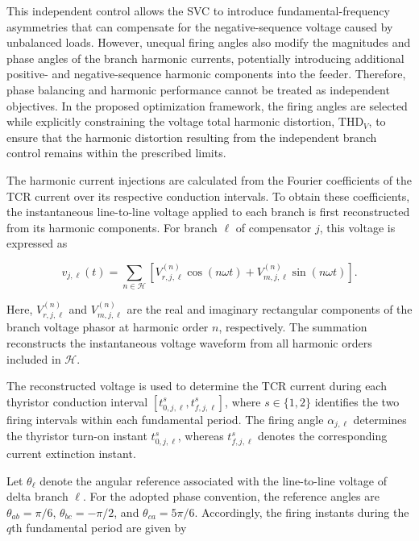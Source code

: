 \documentclass[journal]{IEEEtran}
\begin{document}
This independent control allows the SVC to introduce fundamental-frequency
asymmetries that can compensate for the negative-sequence voltage caused
by unbalanced loads. However, unequal firing angles also modify the
magnitudes and phase angles of the branch harmonic currents, potentially
introducing additional positive- and negative-sequence harmonic
components into the feeder. Therefore, phase balancing and harmonic
performance cannot be treated as independent objectives. In the proposed
optimization framework, the firing angles are selected while explicitly
constraining the voltage total harmonic distortion, $\mathrm{THD}_V$,
to ensure that the harmonic distortion resulting from the independent
branch control remains within the prescribed limits.



The harmonic current injections are calculated from the Fourier
coefficients of the TCR current over its respective conduction intervals.
To obtain these coefficients, the instantaneous line-to-line voltage
applied to each branch is first reconstructed from its harmonic components.
For branch $\ell$ of compensator $j$, this voltage is expressed as

\begin{equation}
    v_{j,\ell}(t)=
    \sum_{n\in\mathcal{H}}
    \left[V_{r,j,\ell}^{(n)}\cos(n\omega t)+
    V_{m,j,\ell}^{(n)}\sin(n\omega t)\right].
    \label{eq:branch_voltage_waveform}
\end{equation}

Here, $V_{r,j,\ell}^{(n)}$ and $V_{m,j,\ell}^{(n)}$ are the real and
imaginary rectangular components of the branch voltage phasor at harmonic
order $n$, respectively. The summation reconstructs the instantaneous
voltage waveform from all harmonic orders included in $\mathcal{H}$.

The reconstructed voltage is used to determine the TCR current during
each thyristor conduction interval
$[t_{0,j,\ell}^{s},t_{f,j,\ell}^{s}]$, where
$s\in\{1,2\}$ identifies the two firing intervals within each fundamental
period. The firing angle $\alpha_{j,\ell}$ determines the thyristor
turn-on instant $t_{0,j,\ell}^{s}$, whereas
$t_{f,j,\ell}^{s}$ denotes the corresponding current extinction instant.

Let $\theta_\ell$ denote the angular reference associated with the
line-to-line voltage of delta branch $\ell$. For the adopted phase
convention, the reference angles are
$\theta_{ab}=\pi/6$, $\theta_{bc}=-\pi/2$, and
$\theta_{ca}=5\pi/6$. Accordingly, the firing instants during the
$q$th fundamental period are given by
\end{document}
